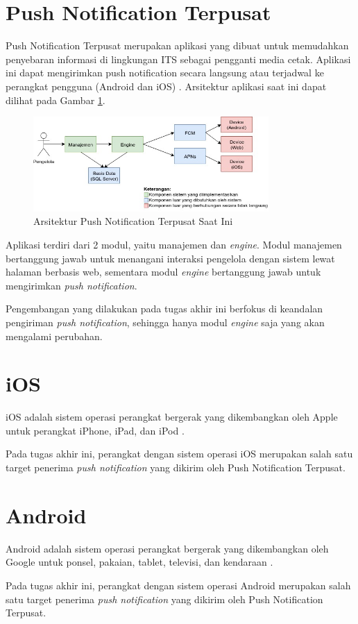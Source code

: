 \section{Push Notification Terpusat}
\par Push Notification Terpusat merupakan aplikasi yang dibuat untuk memudahkan penyebaran informasi di lingkungan ITS sebagai pengganti media cetak. Aplikasi ini dapat mengirimkan push notification secara langsung atau terjadwal ke perangkat pengguna (Android dan iOS) \cite{application-thesis}. Arsitektur aplikasi saat ini dapat dilihat pada Gambar \ref{img:arsitektur-pnt_lama}.
\begin{figure}[H]
	\centering\includegraphics[width=0.8\textwidth]{bab2/img/arsitektur-push_notification_terpusat_lama.jpg}
	\caption{Arsitektur Push Notification Terpusat Saat Ini}
	\label{img:arsitektur-pnt_lama}
\end{figure}
\par Aplikasi terdiri dari 2 modul, yaitu manajemen dan \textit{engine}. Modul manajemen bertanggung jawab untuk menangani interaksi pengelola dengan sistem lewat halaman berbasis web, sementara modul \textit{engine} bertanggung jawab untuk mengirimkan \textit{push notification}.
\par Pengembangan yang dilakukan pada tugas akhir ini berfokus di keandalan pengiriman \textit{push notification}, sehingga hanya modul \textit{engine} saja yang akan mengalami perubahan. 

\section{iOS}
\par iOS adalah sistem operasi perangkat bergerak yang dikembangkan oleh Apple untuk perangkat iPhone, iPad, dan iPod \cite{ios-online}.
\par Pada tugas akhir ini, perangkat dengan sistem operasi iOS merupakan salah satu target penerima \textit{push notification} yang dikirim oleh Push Notification Terpusat.

\section{Android}
\par Android adalah sistem operasi perangkat bergerak yang dikembangkan oleh Google untuk ponsel, pakaian, tablet, televisi, dan kendaraan \cite{android-online}.
\par Pada tugas akhir ini, perangkat dengan sistem operasi Android merupakan salah satu target penerima \textit{push notification} yang dikirim oleh Push Notification Terpusat.

